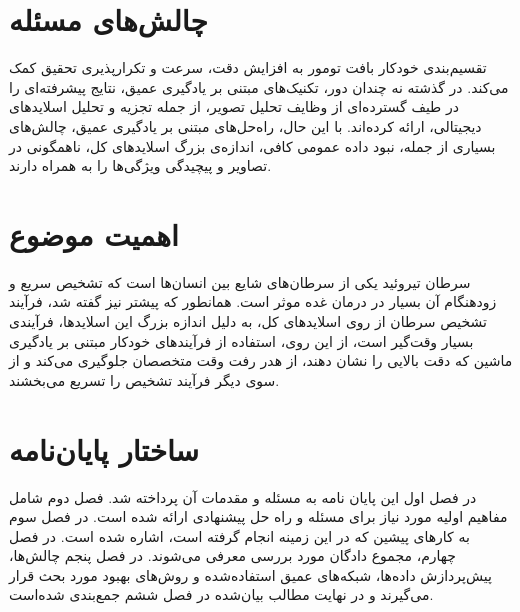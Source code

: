 \section{چالش‌های مسئله}\label{sec:چالش‌های مسئله}
تقسیم‌بندی خودکار بافت تومور به افزایش دقت، سرعت و تکرارپذیری تحقیق کمک می‌کند. در گذشته نه چندان دور، تکنیک‌های مبتنی بر یادگیری عمیق، نتایج پیشرفته‌ای را در طیف گسترده‌ای از وظایف تحلیل تصویر، از جمله تجزیه و تحلیل اسلایدهای دیجیتالی، ارائه کرده‌اند. با این حال، راه‌حل‌های مبتنی بر یادگیری عمیق، چالش‌های بسیاری از جمله، نبود داده عمومی کافی، اندازه‌ی بزرگ اسلاید‌های کل، ناهمگونی در تصاویر و پیچیدگی ویژگی‌ها را به همراه دارند.



\section{اهمیت موضوع}\label{sec:اهمیت موضوع}
سرطان تیروئید یکی از سرطان‌های شایع بین انسان‌ها است که تشخیص سریع و زودهنگام آن بسیار در درمان غده موثر است.
همانطور که پیشتر نیز گفته شد، فرآیند تشخیص سرطان از روی اسلاید‌های کل، به دلیل اندازه بزرگ این اسلایدها، فرآیندی بسیار وقت‌گیر است، از این روی، استفاده از فرآیند‌های خودکار مبتنی بر یادگیری ماشین که دقت بالایی را نشان دهند، از هدر رفت وقت متخصصان جلوگیری می‌کند و از سوی دیگر فرآیند تشخیص را تسریع می‌بخشند.


\section{ساختار پایان‌نامه}\label{sec:ساختار پایان‌نامه}
در فصل اول این پایان نامه به مسئله و مقدمات آن پرداخته شد.
فصل دوم شامل مفاهیم اولیه مورد نیاز برای مسئله و راه حل پیشنهادی ارائه شده است.
در فصل سوم به کارهای پیشین که در این زمینه انجام گرفته است، اشاره شده است.
در فصل چهارم، مجموع دادگان مورد بررسی معرفی می‌شوند.
در فصل پنجم چالش‌ها، پیش‌پردازش داده‌ها، شبکه‌های عمیق استفاده‌شده و روش‌های بهبود مورد بحث قرار می‌گیرند و در نهایت مطالب بیان‌شده در فصل ششم جمع‌بندی شده‌است.
 


